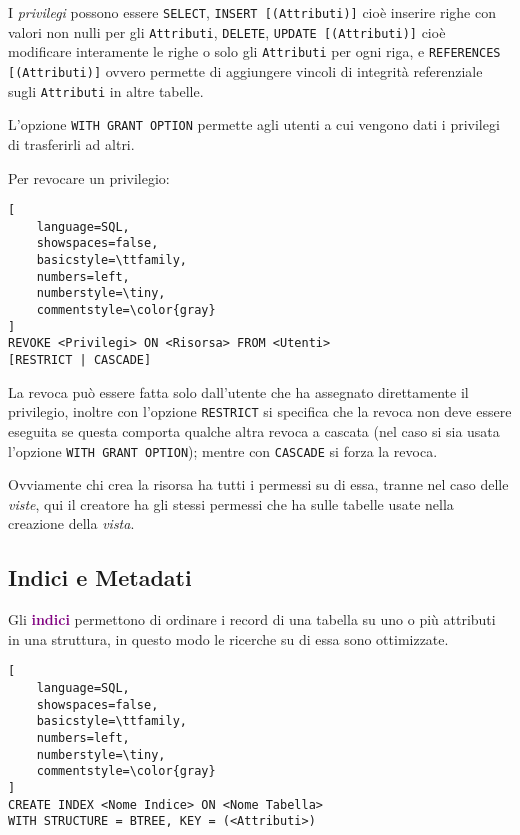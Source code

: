 I \emph{privilegi} possono essere \verb|SELECT|, \verb|INSERT [(Attributi)]| cioè inserire
righe con valori non nulli per gli \verb|Attributi|, \verb|DELETE|, \verb|UPDATE [(Attributi)]| cioè
modificare interamente le righe o solo gli \verb|Attributi| per ogni riga, e \verb|REFERENCES [(Attributi)]| ovvero
permette di aggiungere vincoli di integrità referenziale sugli \verb|Attributi| in altre tabelle.

L'opzione \verb|WITH GRANT OPTION| permette agli utenti a cui vengono dati i privilegi di trasferirli
ad altri.

Per revocare un privilegio:
\begin{lstlisting}[
    language=SQL,
    showspaces=false,
    basicstyle=\ttfamily,
    numbers=left,
    numberstyle=\tiny,
    commentstyle=\color{gray}
]
REVOKE <Privilegi> ON <Risorsa> FROM <Utenti>
[RESTRICT | CASCADE]
\end{lstlisting}

La revoca può essere fatta solo dall'utente che ha assegnato
direttamente il privilegio, inoltre con l'opzione \verb|RESTRICT| si specifica
che la revoca non deve essere eseguita se questa comporta qualche altra revoca
a cascata (nel caso si sia usata l'opzione \verb|WITH GRANT OPTION|); mentre
con \verb|CASCADE| si forza la revoca.

Ovviamente chi crea la risorsa ha tutti i permessi su di essa, tranne nel caso
delle \emph{viste}, qui il creatore ha gli stessi permessi che ha sulle tabelle usate
nella creazione della \emph{vista}.

\subsection{Indici e Metadati}

Gli \textbf{\textcolor{purple}{indici}} permettono di ordinare
i record di una tabella su uno o più attributi in una struttura,
in questo modo le ricerche su di essa sono ottimizzate.

\begin{lstlisting}[
    language=SQL,
    showspaces=false,
    basicstyle=\ttfamily,
    numbers=left,
    numberstyle=\tiny,
    commentstyle=\color{gray}
]
CREATE INDEX <Nome Indice> ON <Nome Tabella>
WITH STRUCTURE = BTREE, KEY = (<Attributi>)
\end{lstlisting}

